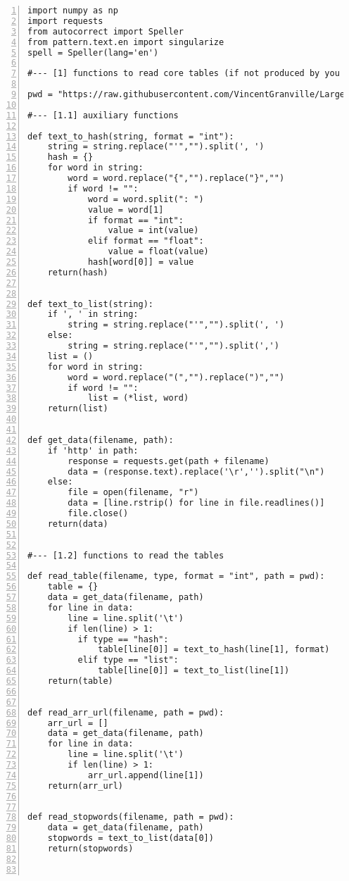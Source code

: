 \documentclass[oneside,10pt]{book}
\begin{document}
\begin{lstlisting}[numbers=left]
import numpy as np
import requests
from autocorrect import Speller
from pattern.text.en import singularize
spell = Speller(lang='en')

#--- [1] functions to read core tables (if not produced by you script)

pwd = "https://raw.githubusercontent.com/VincentGranville/Large-Language-Models/main/llm5/"

#--- [1.1] auxiliary functions

def text_to_hash(string, format = "int"): 
    string = string.replace("'","").split(', ')
    hash = {}
    for word in string:
        word = word.replace("{","").replace("}","")
        if word != "":
            word = word.split(": ")
            value = word[1]
            if format == "int":
                value = int(value)
            elif format == "float":
                value = float(value)
            hash[word[0]] = value
    return(hash)


def text_to_list(string):
    if ', ' in string:
        string = string.replace("'","").split(', ')
    else:
        string = string.replace("'","").split(',')
    list = ()
    for word in string:
        word = word.replace("(","").replace(")","")
        if word != "":
            list = (*list, word)
    return(list)


def get_data(filename, path):
    if 'http' in path: 
        response = requests.get(path + filename)
        data = (response.text).replace('\r','').split("\n")
    else:
        file = open(filename, "r")
        data = [line.rstrip() for line in file.readlines()] 
        file.close()
    return(data)


#--- [1.2] functions to read the tables

def read_table(filename, type, format = "int", path = pwd): 
    table = {}
    data = get_data(filename, path)
    for line in data:
        line = line.split('\t')
        if len(line) > 1:
          if type == "hash":
              table[line[0]] = text_to_hash(line[1], format)
          elif type == "list": 
              table[line[0]] = text_to_list(line[1])
    return(table)


def read_arr_url(filename, path = pwd):
    arr_url = []
    data = get_data(filename, path)
    for line in data:
        line = line.split('\t')
        if len(line) > 1:
            arr_url.append(line[1])
    return(arr_url)


def read_stopwords(filename, path = pwd):
    data = get_data(filename, path)
    stopwords = text_to_list(data[0])
    return(stopwords)



\end{lstlisting}
\end{document}
